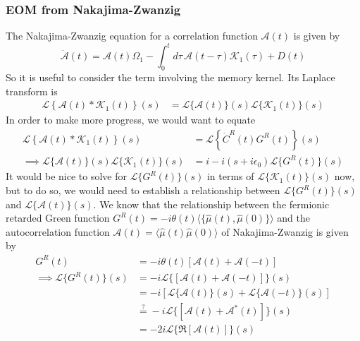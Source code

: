 \subsubsection{EOM from Nakajima-Zwanzig}
The Nakajima-Zwanzig equation for a correlation function $\mathcal{A}(t)$ is given by
\begin{equation}
\dot{\mathcal{A}}(t) = \mathcal{A}(t) {\Omega_1} - \int_{0}^{t} d \tau\, \mathcal{A}(t - \tau) \mathcal{K}_1(\tau) + D(t)
\label{eq:GQME}
\end{equation}
So it is useful to consider the term involving the memory kernel. Its Laplace transform is
\begin{align}
\mathcal{L}\left\{\mathcal{A}(t)*\mathcal{K}_1(t)\right\}(s) &= \mathcal{L}\{\mathcal{A}(t)\}(s) \mathcal{L}\{\mathcal{K}_1(t)\}(s)
\end{align}
In order to make more progress, we would want to equate
\begin{align}
\mathcal{L}\left\{\mathcal{A}(t)*\mathcal{K}_1(t)\right\}(s) &= \mathcal{L}\left\{\dot{C}^R(t)G^R(t)\right\}(s) \\
\implies \mathcal{L}\{\mathcal{A}(t)\}(s) \mathcal{L}\{\mathcal{K}_1(t)\}(s) &= i - i(s + i\epsilon_0)\mathcal{L}\{G^R(t)\}(s) 
\end{align}
It would be nice to solve for $\mathcal{L}\{G^R(t)\}(s) $ in terms of $\mathcal{L}\{\mathcal{K}_1(t)\}(s)$ now, but to do so, we would need to establish a relationship between $\mathcal{L}\{G^R(t)\}(s)$ and $\mathcal{L}\{\mathcal{A}(t)\}(s)$. We know that the relationship between the fermionic retarded Green function $G^R(t) = -i \theta(t) \langle \{ \hat{\mu}(t), \hat{\mu}(0) \} \rangle$ and the autocorrelation function $\mathcal{A}(t)= \langle\hat{\mu}(t) \hat{\mu}(0)\rangle$ of Nakajima-Zwanzig is given by
\begin{align}
G^R(t) &= -i \theta(t) \left[\mathcal{A}(t) + \mathcal{A}(-t)\right]\\
\implies \mathcal{L}\{G^R(t)\}(s) &= -i \mathcal{L}\{ \left[\mathcal{A}(t) + \mathcal{A}(-t)\right]\}(s) \\
&= -i \left[\mathcal{L}\{\mathcal{A}(t)\}(s) + \mathcal{L}\{\mathcal{A}(-t)\}(s)\right] \\
 &\overset{?}{=} -i \mathcal{L}\{ \left[\mathcal{A}(t) + \mathcal{A}^*(t)\right]\}(s) \label{eq:questionable_step}\\
&= -2i \mathcal{L}\{\Re[\mathcal{A}(t)]\}(s) 
\end{align}
